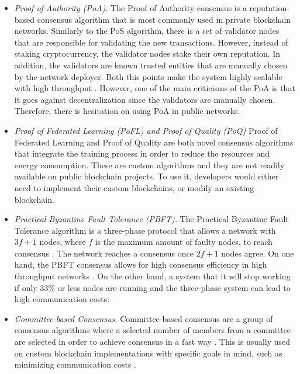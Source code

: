 \begin{itemize}
    \item \textit{Proof of Authority (PoA).} The Proof of Authority consensus is a reputation-based consensus algorithm that is most commonly used in private blockchain networks. Similarly to the PoS algorithm, there is a set of validator nodes that are responsible for validating the new transactions. However, instead of staking cryptocurrency, the validator nodes stake their own reputation. In addition, the validators are known trusted entities that are manually chosen by the network deployer. Both this points make the system highly scalable with high throughput \cite{binance_academy_2020}. However, one of the main criticisms of the PoA is that it goes against decentralization since the validators are manually chosen. Therefore, there is hesitation on using PoA in public networks.

    \item \textit{Proof of Federated Learning (PoFL) and Proof of Quality (PoQ)} Proof of Federated Learning \cite{9347812, 10.48550/arxiv.2007.15145} and Proof of Quality \cite{8843900} are both novel consensus algorithms that integrate the training process in order to reduce the resources and energy consumption. These are custom algorithms and they are not readily available on public blockchain projects. To use it, developers would either need to implement their custom blockchains, or modify an existing blockchain.

    \item \textit{Practical Byzantine Fault Tolerance (PBFT).} The Practical Byzantine Fault Tolerance algorithm is a three-phase protocol that allows a network with $3f+1$ nodes, where $f$ is the maximum amount of faulty nodes, to reach consensus \cite{Castro99practicalbyzantine}. The network reaches a consensus once $2f+1$ nodes agree. On one hand, the PBFT consensus allows for high consensus efficiency in high throughput networks \cite{li_blockchain_2021}. On the other hand, a system that it will stop working if only 33\% or less nodes are running and the three-phase system can lead to high communication costs.

    \item \textit{Committee-based Consensus.} Committee-based consensus are a group of consensus algorithms where a selected number of members from a committee are selected in order to achieve consensus in a fast way \cite{qu_blockchain-enabled_2022}. This is usually used on custom blockchain implementations with specific goals in mind, such as minimizing communication costs \cite{9293091}.
\end{itemize}

